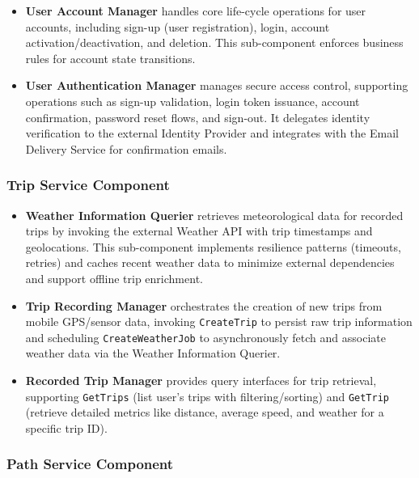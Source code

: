 \begin{itemize}
    \item \textbf{User Account Manager} handles core life-cycle operations for user accounts, including sign-up (user registration), login, account activation/deactivation, and deletion. This sub-component enforces business rules for account state transitions.
    \item \textbf{User Authentication Manager} manages secure access control, supporting operations such as sign-up validation, login token issuance, account confirmation, password reset flows, and sign-out. It delegates identity verification to the external Identity Provider and integrates with the Email Delivery Service for confirmation emails.
\end{itemize}

\subsubsection*{Trip Service Component}

\begin{itemize}
    \item \textbf{Weather Information Querier} retrieves meteorological data for recorded trips by invoking the external Weather API with trip timestamps and geolocations. This sub-component implements resilience patterns (timeouts, retries) and caches recent weather data to minimize external dependencies and support offline trip enrichment.
    \item \textbf{Trip Recording Manager} orchestrates the creation of new trips from mobile GPS/sensor data, invoking \texttt{CreateTrip} to persist raw trip information and scheduling \texttt{CreateWeatherJob} to asynchronously fetch and associate weather data via the Weather Information Querier.
    \item \textbf{Recorded Trip Manager} provides query interfaces for trip retrieval, supporting \texttt{GetTrips} (list user's trips with filtering/sorting) and \texttt{GetTrip} (retrieve detailed metrics like distance, average speed, and weather for a specific trip ID).
\end{itemize}

\subsubsection*{Path Service Component}

